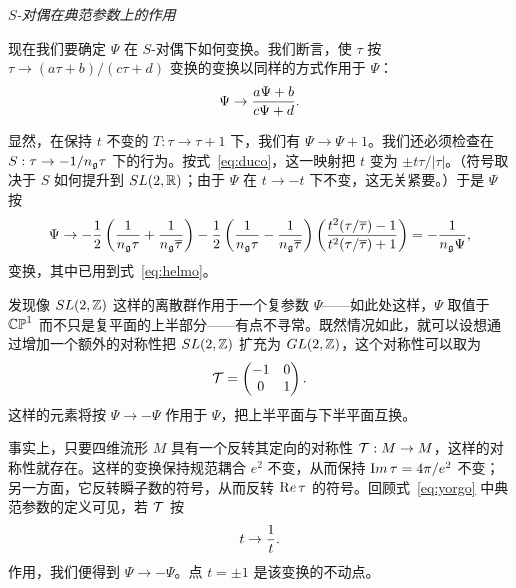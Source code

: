 \par\medskip\emph{$S$-对偶在典范参数上的作用}

现在我们要确定 $\Psi$ 在 $S$-对偶下如何变换。我们断言，使 $\tau$ 按 $\tau\to(a\tau+b)/(c\tau+d)$ 变换的变换以同样的方式作用于 $\Psi$：%
\setcounter{equation}{52}
\begin{equation}\label{eq:yrto}
\Psi\to
{a\Psi+b\over c\Psi+d}.
\end{equation}

显然，在保持 $t$ 不变的 $T:\tau\to\tau+1$ 下，我们有 $\Psi\to\Psi+1$。我们还必须检查在 $S:\tau\to-1/n_{\frak g}\tau$ 下的行为。按式~\eqref{eq:duco}，这一映射把 $t$ 变为 $\pm t\tau/|\tau|$。（符号取决于 $S$ 如何提升到 $SL(2,\Bbb{R})$；由于 $\Psi$ 在 $t\to-t$ 下不变，这无关紧要。）于是 $\Psi$ 按
\setcounter{equation}{53}
\begin{equation}\label{eq:nelmo}
\Psi\to -{1\over 2}\left({1\over n_{\frak
g}\tau}+{1\over n_{\frak g}\bar \tau}\right)-{1\over
2}\left({1\over n_{\frak g}\tau}-{1\over n_{\frak
g}\bar\tau}\right)\left({t^2(\tau/ \bar\tau)-1\over t^2(
\tau/\bar\tau)+1}\right)=-{1\over n_{\frak g} \Psi},
\end{equation}
变换，其中已用到式~\eqref{eq:helmo}。

\par{}

发现像 $SL(2,\Bbb{Z})$ 这样的离散群作用于一个复参数 $\Psi$——如此处这样，$\Psi$ 取值于 $\Bbb{CP}^1$ 而不只是复平面的上半部分——有点不寻常。既然情况如此，就可以设想通过增加一个额外的对称性把 $SL(2,\Bbb{Z})$ 扩充为 $GL(2,\Bbb{Z})$，这个对称性可以取为%
\setcounter{equation}{54}
\begin{equation}\label{eq:ysnon}
{\EUT}=\left(\begin{matrix}-1 & 0 \\
0 & 1\end{matrix}\right).
\end{equation}
这样的元素将按 $\Psi\to-\Psi$ 作用于 $\Psi$，把上半平面与下半平面互换。

事实上，只要四维流形 $M$ 具有一个反转其定向的对称性 ${\EUT}:M\to M$，这样的对称性就存在。这样的变换保持规范耦合 $e^2$ 不变，从而保持 ${\rm Im}\,\tau=4\pi/e^2$ 不变；另一方面，它反转瞬子数的符号，从而反转 ${\rm Re}\,\tau$ 的符号。回顾式~\eqref{eq:yorgo} 中典范参数的定义可见，若 ${\EUT}$ 按%
\setcounter{equation}{55}
\begin{equation}\label{eq:zongor}
t\to
{1\over t}.
\end{equation}
作用，我们便得到 $\Psi\to-\Psi$。点 $t=\pm 1$ 是该变换的不动点。

